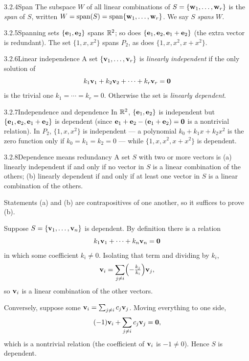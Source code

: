 \begin{defns}{3.2.4}{Span}
The subspace $W$ of all linear combinations of $S=\{\mathbf{w}_1,\dots,\mathbf{w}_r\}$ is the \emph{span} of $S$, written $W=\operatorname{span}(S)=\operatorname{span}\{\mathbf{w}_1,\dots,\mathbf{w}_r\}$. We say $S$ \emph{spans} $W$.
\end{defns}

\begin{exmp}{3.2.5}{Spanning sets}
$\{\mathbf{e}_1,\mathbf{e}_2\}$ spans $\mathbb{R}^2$; so does $\{\mathbf{e}_1,\mathbf{e}_2,\mathbf{e}_1+\mathbf{e}_2\}$ (the extra vector is redundant). The set $\{1,x,x^2\}$ spans $P_2$, as does $\{1,x,x^2,x+x^2\}$.
\end{exmp}

\begin{defns}{3.2.6}{Linear independence}
A set $\{\mathbf{v}_1,\dots,\mathbf{v}_r\}$ is \emph{linearly independent} if the only solution of
\[
k_1\mathbf{v}_1+k_2\mathbf{v}_2+\cdots+k_r\mathbf{v}_r=\mathbf{0}
\]
is the trivial one $k_1=\cdots=k_r=0$. Otherwise the set is \emph{linearly dependent}.
\end{defns}

\begin{exmp}{3.2.7}{Independence and dependence}
In $\mathbb{R}^2$, $\{\mathbf{e}_1,\mathbf{e}_2\}$ is independent but $\{\mathbf{e}_1,\mathbf{e}_2,\mathbf{e}_1+\mathbf{e}_2\}$ is dependent (since $\mathbf{e}_1+\mathbf{e}_2-(\mathbf{e}_1+\mathbf{e}_2)=\mathbf{0}$ is a nontrivial relation). In $P_2$, $\{1,x,x^2\}$ is independent --- a polynomial $k_0+k_1x+k_2x^2$ is the zero function only if $k_0=k_1=k_2=0$ --- while $\{1,x,x^2,x+x^2\}$ is dependent.
\end{exmp}

\begin{thms}{3.2.8}{Dependence means redundancy}
A set $S$ with two or more vectors is
\textup{(a)} linearly independent if and only if no vector in $S$ is a linear combination of the others;
\textup{(b)} linearly dependent if and only if at least one vector in $S$ is a linear combination of the others.
\end{thms}

\begin{prf}
Statements (a) and (b) are contrapositives of one another, so it suffices to prove (b).

\case{($\Rightarrow$)} Suppose $S=\{\mathbf{v}_1,\dots,\mathbf{v}_n\}$ is dependent. By definition there is a relation
\[
k_1\mathbf{v}_1+\cdots+k_n\mathbf{v}_n=\mathbf{0}
\]
in which some coefficient $k_i\neq0$. Isolating that term and dividing by $k_i$,
\[
\mathbf{v}_i=\sum_{j\neq i}\Bigl(-\tfrac{k_j}{k_i}\Bigr)\mathbf{v}_j,
\]
so $\mathbf{v}_i$ is a linear combination of the other vectors.

\case{($\Leftarrow$)} Conversely, suppose some $\mathbf{v}_i=\sum_{j\neq i}c_j\mathbf{v}_j$. Moving everything to one side,
\[
(-1)\mathbf{v}_i+\sum_{j\neq i}c_j\mathbf{v}_j=\mathbf{0},
\]
which is a nontrivial relation (the coefficient of $\mathbf{v}_i$ is $-1\neq0$). Hence $S$ is dependent.
\end{prf}

